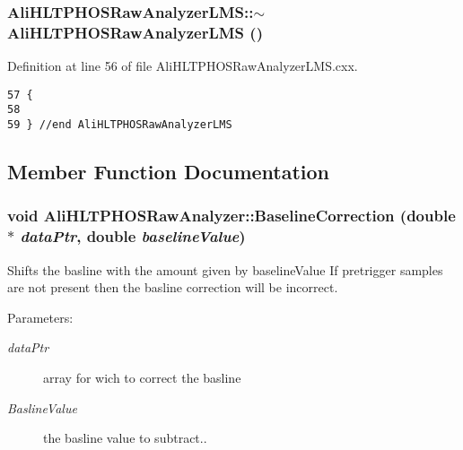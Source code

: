 \subsubsection{\setlength{\rightskip}{0pt plus 5cm}Ali\-HLTPHOSRaw\-Analyzer\-LMS::$\sim${\bf Ali\-HLTPHOSRaw\-Analyzer\-LMS} ()\hspace{0.3cm}{\tt  [virtual]}}\label{classAliHLTPHOSRawAnalyzerLMS_AliHLTPHOSRawAnalyzerLMSa4}




Definition at line 56 of file Ali\-HLTPHOSRaw\-Analyzer\-LMS.cxx.

\footnotesize\begin{verbatim}57 {
58 
59 } //end AliHLTPHOSRawAnalyzerLMS
\end{verbatim}\normalsize 




\subsection{Member Function Documentation}
\subsubsection{\setlength{\rightskip}{0pt plus 5cm}void Ali\-HLTPHOSRaw\-Analyzer::Baseline\-Correction (double $\ast$ {\em data\-Ptr}, double {\em baseline\-Value})\hspace{0.3cm}{\tt  [inherited]}}\label{classAliHLTPHOSRawAnalyzer_AliHLTPHOSRawAnalyzerPeakFindera8}


Shifts the basline with the amount given by baseline\-Value If pretrigger samples are not present then the basline correction will be incorrect. \begin{Desc}
\item[Parameters:]
\begin{description}
\item[{\em data\-Ptr}]array for wich to correct the basline \item[{\em Basline\-Value}]the basline value to subtract.. \end{description}
\end{Desc}


